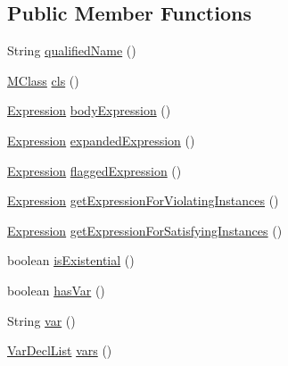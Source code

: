 \subsection*{Public Member Functions}
\begin{DoxyCompactItemize}
\item 
String \hyperlink{classorg_1_1tzi_1_1use_1_1uml_1_1mm_1_1_m_class_invariant_ac5ce60d079e02e93c4e489a965d4f2ad}{qualified\-Name} ()
\item 
\hyperlink{interfaceorg_1_1tzi_1_1use_1_1uml_1_1mm_1_1_m_class}{M\-Class} \hyperlink{classorg_1_1tzi_1_1use_1_1uml_1_1mm_1_1_m_class_invariant_af0fbe95b13303de5d68865acb0c9694f}{cls} ()
\item 
\hyperlink{classorg_1_1tzi_1_1use_1_1uml_1_1ocl_1_1expr_1_1_expression}{Expression} \hyperlink{classorg_1_1tzi_1_1use_1_1uml_1_1mm_1_1_m_class_invariant_abf6f90a15535c1edcc5fb3a53c56623d}{body\-Expression} ()
\item 
\hyperlink{classorg_1_1tzi_1_1use_1_1uml_1_1ocl_1_1expr_1_1_expression}{Expression} \hyperlink{classorg_1_1tzi_1_1use_1_1uml_1_1mm_1_1_m_class_invariant_a7b3d85eee64d723bd6115720e27c305a}{expanded\-Expression} ()
\item 
\hyperlink{classorg_1_1tzi_1_1use_1_1uml_1_1ocl_1_1expr_1_1_expression}{Expression} \hyperlink{classorg_1_1tzi_1_1use_1_1uml_1_1mm_1_1_m_class_invariant_a1876cfb18a5786370c0a1bd94e711d41}{flagged\-Expression} ()
\item 
\hyperlink{classorg_1_1tzi_1_1use_1_1uml_1_1ocl_1_1expr_1_1_expression}{Expression} \hyperlink{classorg_1_1tzi_1_1use_1_1uml_1_1mm_1_1_m_class_invariant_a0ab393f33bf0594ccd2ac0c8f053da27}{get\-Expression\-For\-Violating\-Instances} ()
\item 
\hyperlink{classorg_1_1tzi_1_1use_1_1uml_1_1ocl_1_1expr_1_1_expression}{Expression} \hyperlink{classorg_1_1tzi_1_1use_1_1uml_1_1mm_1_1_m_class_invariant_ae88ee457f90ff6bc6194ffc66e9dae12}{get\-Expression\-For\-Satisfying\-Instances} ()
\item 
boolean \hyperlink{classorg_1_1tzi_1_1use_1_1uml_1_1mm_1_1_m_class_invariant_a37e9ef6f4372076e0cd5a55bc32e173b}{is\-Existential} ()
\item 
boolean \hyperlink{classorg_1_1tzi_1_1use_1_1uml_1_1mm_1_1_m_class_invariant_a8ed4eaf49d4ff3a68955830e2d71e7d5}{has\-Var} ()
\item 
String \hyperlink{classorg_1_1tzi_1_1use_1_1uml_1_1mm_1_1_m_class_invariant_a99f4524370031282aafca1c07729fbee}{var} ()
\item 
\hyperlink{classorg_1_1tzi_1_1use_1_1uml_1_1ocl_1_1expr_1_1_var_decl_list}{Var\-Decl\-List} \hyperlink{classorg_1_1tzi_1_1use_1_1uml_1_1mm_1_1_m_class_invariant_a237476cd0583baa4557763087f6557c5}{vars} ()

\end{DoxyCompactItemize}
